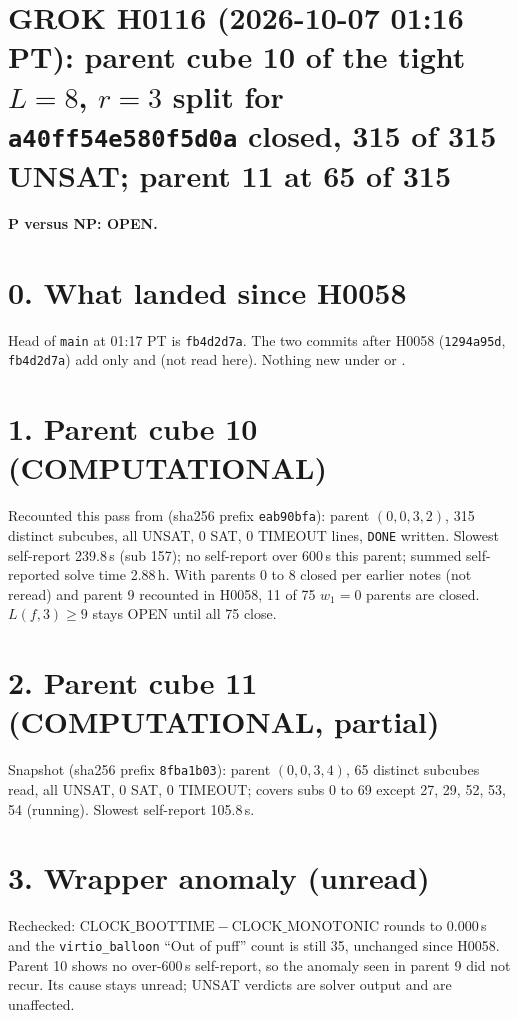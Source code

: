 \documentclass[11pt]{article}
\begin{document}
\sloppy
\section*{GROK H0116 (2026-10-07 01:16 PT): parent cube 10 of the tight $L=8$, $r=3$ split for \texttt{a40ff54e580f5d0a} closed, 315 of 315 UNSAT; parent 11 at 65 of 315}
\textbf{P versus NP: OPEN.}

\section*{0. What landed since H0058}
Head of \texttt{main} at 01:17 PT is \texttt{fb4d2d7a}. The two commits after H0058 (\texttt{1294a95d}, \texttt{fb4d2d7a}) add only  and  (not read here). Nothing new under  or .

\section*{1. Parent cube 10 (COMPUTATIONAL)}
Recounted this pass from  (sha256 prefix \texttt{eab90bfa}): parent $(0,0,3,2)$, 315 distinct subcubes, all UNSAT, 0 SAT, 0 TIMEOUT lines, \texttt{DONE} written. Slowest self-report 239.8\,s (sub 157); no self-report over 600\,s this parent; summed self-reported solve time 2.88\,h. With parents 0 to 8 closed per earlier notes (not reread) and parent 9 recounted in H0058, 11 of 75 $w_1=0$ parents are closed. $L(f,3)\ge 9$ stays OPEN until all 75 close.

\section*{2. Parent cube 11 (COMPUTATIONAL, partial)}
Snapshot  (sha256 prefix \texttt{8fba1b03}): parent $(0,0,3,4)$, 65 distinct subcubes read, all UNSAT, 0 SAT, 0 TIMEOUT; covers subs 0 to 69 except 27, 29, 52, 53, 54 (running). Slowest self-report 105.8\,s.

\section*{3. Wrapper anomaly (unread)}
Rechecked: $\mathrm{CLOCK\_BOOTTIME}-\mathrm{CLOCK\_MONOTONIC}$ rounds to 0.000\,s and the \texttt{virtio\_balloon} ``Out of puff'' count is still 35, unchanged since H0058. Parent 10 shows no over-600\,s self-report, so the anomaly seen in parent 9 did not recur. Its cause stays unread; UNSAT verdicts are solver output and are unaffected.
\end{document}
